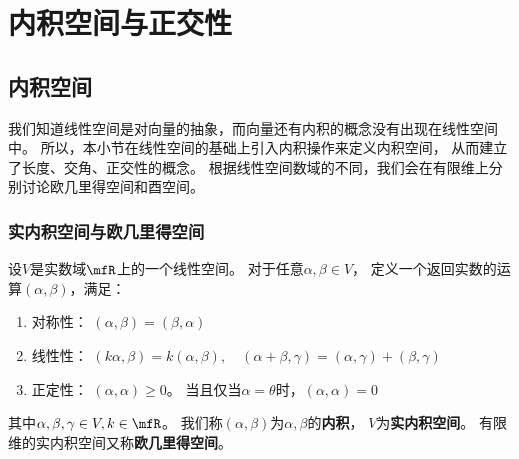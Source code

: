 \chapter{内积空间与正交性}

\section{内积空间}
我们知道线性空间是对向量的抽象，而向量还有内积的概念没有出现在线性空间中。
所以，本小节在线性空间的基础上引入内积操作来定义内积空间，
从而建立了长度、交角、正交性的概念。
根据线性空间数域的不同，我们会在有限维上分别讨论欧几里得空间和酉空间。

\subsection{实内积空间与欧几里得空间}
\begin{definition}[实内积空间与欧几里得空间]
  设$V$是实数域$\mfR$上的一个线性空间。
  对于任意$\alpha,\beta\in V$，
  定义一个返回实数的运算$(\alpha,\beta)$，满足：
  \begin{enumerate}
    \item 对称性：
    $(\alpha,\beta)=(\beta,\alpha)$
    \item 线性性：
    $(k\alpha,\beta)=k(\alpha,\beta),\quad
      (\alpha+\beta,\gamma)=(\alpha,\gamma)+(\beta,\gamma)$
    \item 正定性：
    $(\alpha,\alpha)\ge 0$。
    当且仅当$\alpha=\theta$时，$(\alpha,\alpha)=0$
  \end{enumerate}
  其中$\alpha,\beta,\gamma\in V, k\in\mfR$。
  我们称$(\alpha,\beta)$为$\alpha,\beta$的\textbf{内积}，
  $V$为\textbf{实内积空间}。
  有限维的实内积空间又称\textbf{欧几里得空间}。
\end{definition}

